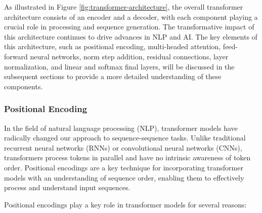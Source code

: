 As illustrated in Figure \ref{fig:transformer-architecture}, the overall transformer architecture consists of an encoder and a decoder, with each component playing a crucial role in processing and sequence generation. The transformative impact of this architecture continues to drive advances in NLP and AI. The key elements of this architecture, such as positional encoding, multi-headed attention, feed-forward neural networks, norm step addition, residual connections, layer normalization, and linear and softmax final layers, will be discussed in the subsequent sections to provide a more detailed understanding of these components.

\subsubsection{Positional Encoding}

In the field of natural language processing (NLP), transformer models have radically changed our approach to sequence-sequence tasks. Unlike traditional recurrent neural networks (RNNs) or convolutional neural networks (CNNs), transformers process tokens in parallel and have no intrinsic awareness of token order. Positional encodings are a key technique for incorporating transformer models with an understanding of sequence order, enabling them to effectively process and understand input sequences. \cite{li2023transformer}

Positional encodings play a key role in transformer models for several reasons:

